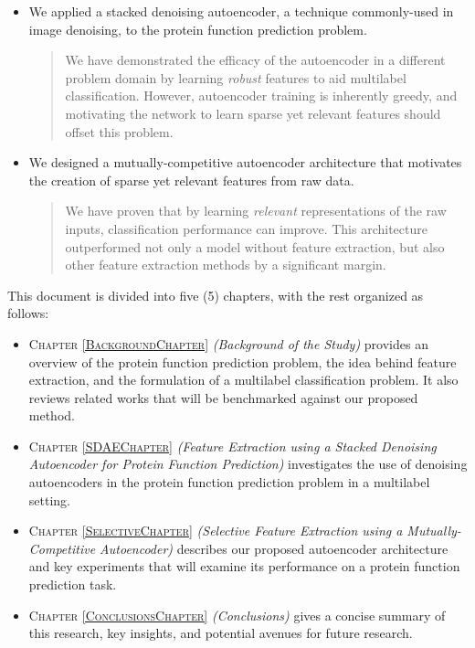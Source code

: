 \begin{itemize}
    \item We applied a stacked denoising autoencoder, a technique
    commonly-used in image denoising, to the protein function prediction problem.
    \begin{quote}
    \par We have demonstrated the efficacy of the autoencoder in a different
    problem domain by learning \textit{robust} features to aid multilabel
    classification. However, autoencoder training is inherently greedy, and
    motivating the network to learn sparse yet relevant features should
    offset this problem.
    \end{quote}
    \item We designed a mutually-competitive autoencoder architecture that
    motivates the creation of sparse yet relevant features from raw data.
    \begin{quote}
    \par We have proven that by learning \textit{relevant} representations
    of the raw inputs, classification performance can improve. This architecture
    outperformed not only a model without feature extraction, but also other
    feature extraction methods by a significant margin. 
    \end{quote}
\end{itemize}



\par \noindent This document is divided into five (5) chapters, with the rest
organized as follows:

\begin{itemize}
    \item \textsc{Chapter \ref{BackgroundChapter}} \textit{(Background of the
    Study)} provides an overview of the protein function prediction problem,
    the idea behind feature extraction, and the formulation of a multilabel
    classification problem. It also reviews related works that will be
    benchmarked against our proposed method.
    \item \textsc{Chapter \ref{SDAEChapter}} \textit{(Feature Extraction
    using a Stacked Denoising Autoencoder for Protein Function Prediction)}
    investigates the use of denoising autoencoders in the protein function
    prediction problem in a multilabel setting.
    \item \textsc{Chapter \ref{SelectiveChapter}} \textit{(Selective Feature
    Extraction using a Mutually-Competitive Autoencoder)} describes our proposed
    autoencoder architecture and key experiments that will examine its performance
    on a protein function prediction task.
    \item \textsc{Chapter \ref{ConclusionsChapter}} \textit{(Conclusions)} gives
    a concise summary of this research, key insights, and potential avenues for
    future research.
\end{itemize}
